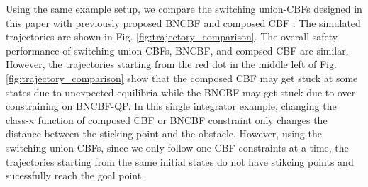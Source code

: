 \documentclass[letterpaper, 10 pt, conference]{ieeeconf}  %
\begin{document}
Using the same example setup, we compare the switching union-CBFs designed in this paper with previously proposed BNCBF \cite{glotfelter2020nonsmooth} and composed CBF \cite{molnar2023composing}. The simulated trajectories are shown in Fig. \ref{fig:trajectory_comparison}.
The overall safety performance of switching union-CBFs, BNCBF, and compsed CBF are similar. However, the trajectories starting from the red dot in the middle left of Fig.\ref{fig:trajectory_comparison} show that the composed CBF may get stuck at some states due to unexpected equilibria while the BNCBF may get stuck due to over constraining on BNCBF-QP. In this single integrator example, changing the class-$\kappa$ function of composed CBF or BNCBF constraint only changes the distance between the sticking point and the obstacle. However, using the switching union-CBFs, since we only follow one CBF constraints at a time, the trajectories starting from the same initial states do not have stikcing points and sucessfully reach the goal point.




\end{document}
